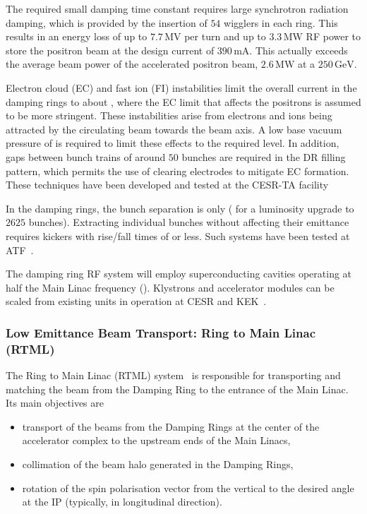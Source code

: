 The required small damping time constant requires large synchrotron radiation damping, which is provided by the insertion of $54$ wigglers in each ring.
This results in an energy loss of up to $7.7\,{\mathrm{MV}}$ per turn and up to $3.3\,{\mathrm{MW}}$ RF power to 
store the positron beam at the design current of $390\,{\mathrm{mA}}$.  This
actually exceeds the average beam power of the accelerated positron beam, $2.6\,{\mathrm{MW}}$ at 
a $250\,{\mathrm{GeV}}$.

Electron cloud (EC) and fast ion (FI) instabilities limit the overall current in the damping rings to about , where the EC limit that affects the positrons is assumed to be more stringent. 
These instabilities arise from electrons and ions being attracted by the circulating beam towards the beam axis. 
A low base vacuum pressure of  is required to limit these effects to the required level.
In addition, gaps between bunch trains of around $50$ bunches are required in the DR filling pattern, which permits the use of clearing electrodes to mitigate EC formation.
These techniques have been developed and tested at the CESR-TA facility~\cite{Conway:2012zza}

In the damping rings, the bunch separation is only  ( for a luminosity upgrade to $2625$ bunches). 
Extracting individual bunches without affecting their emittance requires kickers with rise/fall times of  or less.
Such systems have been tested at ATF~\cite{Naito:2010zzb}.

The damping ring RF system will employ superconducting cavities operating at half the Main Linac frequency ().
Klystrons and accelerator modules can be scaled from existing  units in operation at CESR and KEK~\cite[Sec. 6.6]{Adolphsen:2013kya}. 


\subsubsection{Low Emittance Beam Transport: Ring to Main Linac (RTML)}
\label{sec:rtml}

The Ring to Main Linac (RTML) system~\cite[Chap. 7]{Adolphsen:2013kya} is responsible for transporting and matching the beam from the Damping Ring to the entrance of the Main Linac.
Its main objectives are
\begin{itemize} 
\item transport of the beams from the Damping Rings at the center of the accelerator complex to the upstream ends of the Main Linacs,
\item collimation of the beam halo generated in the Damping Rings,
\item rotation of the spin polarisation vector from the vertical to the desired angle at the IP (typically, in longitudinal direction).
\end{itemize}

